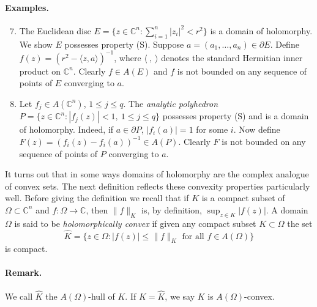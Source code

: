 \paragraph*{Examples.}
\begin{enumerate}\setcounter{enumi}{6}
\item The Euclidean disc $E=\{z\in\mathbb C^n:\sum_{i=1}^n|z_i|^2<r^2\}$ is a domain of holomorphy. We show $E$ possesses property (S). Suppose $a=(a_1,\ldots,a_n)\in\partial E$. Define $f(z)=(r^2-\langle z,a\rangle)^{-1}$, where $\langle\ ,\ \rangle$ denotes the standard Hermitian inner product on $\mathbb C^n$. Clearly $f\in A(E)$ and $f$ is not bounded on any sequence of points of $E$ converging to $a$.
\item Let $f_j\in A(\mathbb C^n)$, $1\leq j\leq q$. The \emph{analytic polyhedron} $P=\{z\in\mathbb C^n:|f_j(z)|<1,\ 1\leq j\leq q\}$ possesses property (S) and is a domain of holomorphy. Indeed, if $a\in\partial P$, $|f_i(a)|=1$ for some $i$. Now define $F(z)=(f_i(z)-f_i(a))^{-1}\in A(P)$. Clearly $F$ is not bounded on any sequence of points of $P$ converging to $a$.
\end{enumerate}
It turns out that in some ways domains of holomorphy are the complex analogue of convex sets. The next definition reflects these
convexity properties particularly well. Before giving the definition we recall that if $K$ is a compact subset of $\Omega\subset\mathbb C^n$ and $f:\Omega\to\mathbb C$, then $\|f\|_K$ is, by definition, $\sup_{z\in K}|f(z)|$.
 A domain $\Omega$ is said to be \emph{holomorphically convex} if given any compact subset $K\subset\Omega$ the set
\[\widehat K=\{z\in\Omega:|f(z)|\leq\|f\|_K\text{ for all }f\in A(\Omega)\}\]
is compact.
\paragraph*{Remark.} We call $\widehat K$ the $A(\Omega)$-hull of $K$. If $K=\widehat K$, we say $K$ is $A(\Omega)$-convex.
